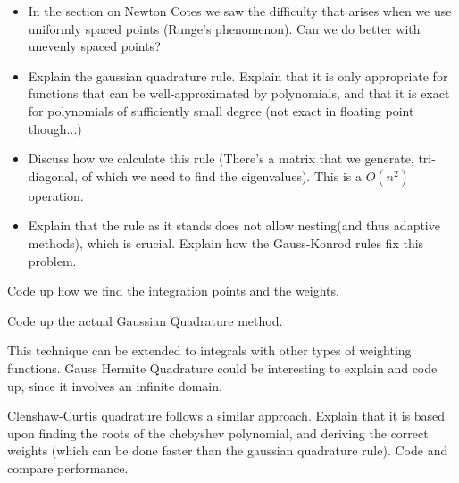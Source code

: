 
\label{Lab:GaussQuad}
\begin{itemize}
\item In the section on Newton Cotes we saw the difficulty that arises when we use uniformly spaced points (Runge's phenomenon). Can we do better with unevenly spaced points?
\item Explain the gaussian quadrature rule. Explain that it is only appropriate for functions that can be well-approximated by polynomials, and that it is exact for polynomials of sufficiently small degree (not exact in floating point though...)
\item Discuss how we calculate this rule (There's a matrix that we generate, tri-diagonal, of which we need to find the eigenvalues). This is a $O(n^2)$ operation.
\item Explain that the rule as it stands does not allow nesting(and thus adaptive methods), which is crucial. Explain how the Gauss-Konrod rules fix this problem.
\end{itemize}

\begin{problem}
Code up how we find the integration points and the weights.
\end{problem}

\begin{problem}
Code up the actual Gaussian Quadrature method.
\end{problem}

\begin{problem}
This technique can be extended to integrals with other types of weighting functions. Gauss Hermite Quadrature could be interesting to explain and code up, since it involves an infinite domain.
\end{problem}

\begin{problem}
Clenshaw-Curtis quadrature follows a similar approach. Explain that it is based upon finding the roots of the chebyshev polynomial, and deriving the correct weights (which can be done faster than the gaussian quadrature rule). Code and compare performance.
\end{problem}



 
